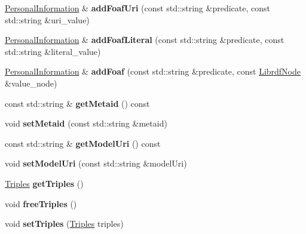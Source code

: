 \begin{DoxyCompactItemize}
\item 
\mbox{\label{classomexmeta_1_1PersonalInformation_a7d760a327fe103386f1bb08063f8795a}} 
\hyperlink{classomexmeta_1_1PersonalInformation}{Personal\+Information} \& {\bfseries add\+Foaf\+Uri} (const std\+::string \&predicate, const std\+::string \&uri\+\_\+value)
\item 
\mbox{\label{classomexmeta_1_1PersonalInformation_ae6fbd4fad2a738fae9fce7affa6b2f15}} 
\hyperlink{classomexmeta_1_1PersonalInformation}{Personal\+Information} \& {\bfseries add\+Foaf\+Literal} (const std\+::string \&predicate, const std\+::string \&literal\+\_\+value)
\item 
\mbox{\label{classomexmeta_1_1PersonalInformation_a99198226df0c8acfdd7bc30ff7c4bf8b}} 
\hyperlink{classomexmeta_1_1PersonalInformation}{Personal\+Information} \& {\bfseries add\+Foaf} (const std\+::string \&predicate, const \hyperlink{classredland_1_1LibrdfNode}{Librdf\+Node} \&value\+\_\+node)
\item 
\mbox{\label{classomexmeta_1_1PersonalInformation_ae00bfe55d51745ac11f37986443feb28}} 
const std\+::string \& {\bfseries get\+Metaid} () const
\item 
\mbox{\label{classomexmeta_1_1PersonalInformation_a2bf7f31511c545eb0158643645115b00}} 
void {\bfseries set\+Metaid} (const std\+::string \&metaid)
\item 
\mbox{\label{classomexmeta_1_1PersonalInformation_a6b2ce3a6c724b67afe3d0c2df00bb484}} 
const std\+::string \& {\bfseries get\+Model\+Uri} () const
\item 
\mbox{\label{classomexmeta_1_1PersonalInformation_afc5f378fc98d02112a9a569f4388552e}} 
void {\bfseries set\+Model\+Uri} (const std\+::string \&model\+Uri)
\item 
\mbox{\label{classomexmeta_1_1PersonalInformation_aecc5783753b41ed88a49c5b3bce82ba4}} 
\hyperlink{classomexmeta_1_1Triples}{Triples} {\bfseries get\+Triples} ()
\item 
\mbox{\label{classomexmeta_1_1PersonalInformation_aea3a34c765f176a3d6f6b88a6b8c8369}} 
void {\bfseries free\+Triples} ()
\item 
\mbox{\label{classomexmeta_1_1PersonalInformation_a25a1e9ba56dda2459cb1bbbe61cc4346}} 
void {\bfseries set\+Triples} (\hyperlink{classomexmeta_1_1Triples}{Triples} triples)
\end{DoxyCompactItemize}


